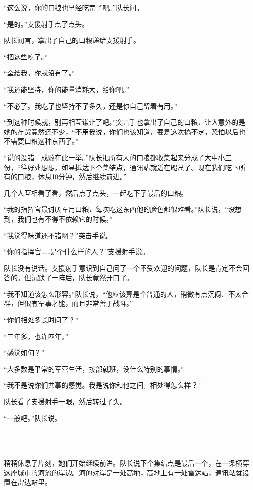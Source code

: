“这么说，你的口粮也早经吃完了吧。”队长问。

“是的。”支援射手点了点头。

队长闻言，拿出了自己的口粮递给支援射手。

“把这些吃了。”

“全给我，你就没有了。”

“我还能坚持，你的能量消耗大，给你吧。”

“不必了。我吃了也坚持不了多久，还是你自己留着有用。”

“到这种时候就，别再相互谦让了吧。”突击手也拿出了自己的口粮，让人意外的是她的存货竟然还不少，“不用我说，你们也该知道，要是这次搞不定，恐怕以后也不需要口粮这种东西了。”

“说的没错，成败在此一举。”队长把所有人的口粮都收集起来分成了大中小三份，“往好处想想，如果抵达下个集结点，通讯站就近在咫尺了。现在我们吃下所有的口粮，休息10分钟，然后继续前进。”

几个人互相看了看，然后点了点头，一起吃下了最后的口粮。

“我的指挥官最讨厌军用口粮，每次吃这东西他的脸色都很难看。”队长说，“没想到，我们也有不得不依赖它的时候。”

“我觉得味道还不错啊？”突击手说。

“你的指挥官……是个什么样的人？”支援射手说。

队长没有说话。支援射手意识到自己问了一个不受欢迎的问题，队长是肯定不会回答的。但沉默了一阵后，队长竟然开口了。

“我不知道该怎么形容。”队长说，“他应该算是个普通的人，稍微有点沉闷、不太合群，但很有军事才能，而且非常善于战斗。”

“你们相处多长时间了？”

“三年多，也许四年。”

“感觉如何？”

“大多数是平常的军营生活，按部就班，没什么特别的事情。”

“我不是说你们共事的感觉。我是说你和他之间，相处得怎么样？”

队长看了支援射手一眼，然后转过了头。

“一般吧。”队长说。



 \section*{}

稍稍休息了片刻，她们开始继续前进。队长说下个集结点是最后一个，在一条横穿这座城市的河流的岸边。河的对岸是一处高地，高地上有一处雷达站，通讯站就设置在雷达站里。

